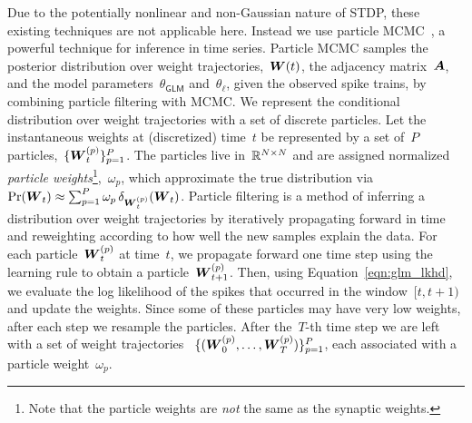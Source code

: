 Due to the potentially nonlinear and non-Gaussian nature of STDP,
these existing techniques are not applicable here. Instead we use
particle MCMC~\cite{Andrieu-2010}, a powerful technique for inference
in time series. Particle MCMC samples the posterior distribution over
weight trajectories,~$\boldsymbol{W}(t)$, the adjacency matrix~$\boldsymbol{A}$, and the
model parameters~$\theta_{\mathsf{GLM}}$ and~$\theta_\ell$, given the
observed spike trains, by combining particle filtering with MCMC.  We
represent the conditional distribution over weight trajectories with a
set of discrete particles.  Let the instantaneous weights at
(discretized) time~$t$ be represented by a set of~$P$
particles,~${\{\boldsymbol{W}_{t}^{(p)}\}_{p=1}^P}$. The particles live
in~$\mathbb{R}^{N \times N}$ and are assigned normalized \emph{particle
  weights}\footnote{Note that the particle weights are \emph{not} the
  same as the synaptic weights.},~$\omega_p$, which approximate the
true distribution via~${\Pr(\boldsymbol{W}_{t}) \approx \sum_{p=1}^P \omega_p \,
  \delta_{\boldsymbol{W}_{t}^{(p)}} (\boldsymbol{W}_{t})}$.  Particle filtering is a method
of inferring a distribution over weight trajectories
by iteratively propagating forward in time and reweighting according
to how well the new samples explain the data.  For each
particle~${\boldsymbol{W}_{t}^{(p)}}$ at time~$t$, we propagate forward one time
step using the learning rule to obtain a particle~${\boldsymbol{W}_{t+1}^{(p)}}$.
Then, using Equation~\ref{eqn:glm_lkhd}, we evaluate the log
likelihood of the spikes that occurred in the window~${[t,t+1)}$ and
  update the weights.
Since some of these particles may have very low weights, after each
step we resample the particles. After the~$T$-th time step we are left
with a set of weight trajectories
~${\{(\boldsymbol{W}_0^{(p)},\ldots,\boldsymbol{W}_{T}^{(p)})\}_{p=1}^P}$, each associated
with a particle weight~$\omega_p$.



